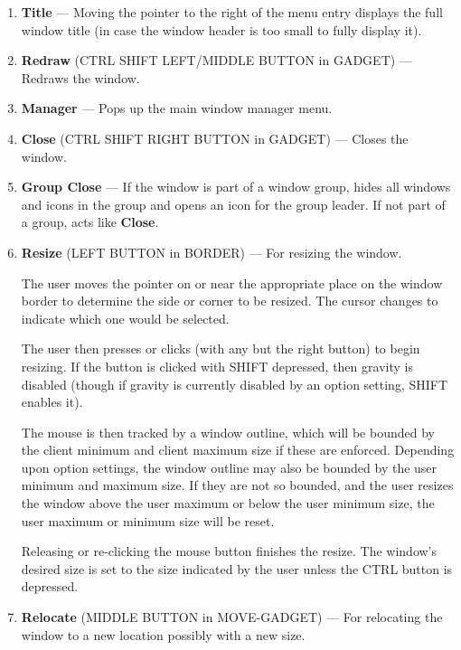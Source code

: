 \begin{enumerate}
\item {\bf Title} --- Moving the pointer to the right of the menu entry displays
the full window title (in case the window header is too small to fully
display it).

\item {\bf Redraw} ({\sc CTRL SHIFT LEFT/MIDDLE BUTTON in GADGET})  --- Redraws the
window.

\item {\bf Manager} --- Pops up the main window manager menu.

\item {\bf Close} ({\sc CTRL SHIFT RIGHT BUTTON in GADGET}) --- Closes the window.

\item {\bf Group Close} --- If the window is part of a window group, hides all
windows and icons in the group and opens an icon for the group leader.
If not part of a group, acts like {\bf Close}.

\item 
{\bf Resize} ({\sc LEFT BUTTON in BORDER}) --- For resizing the window.

The user moves the pointer on or near the appropriate place on the window
border to determine the side or corner to be resized.  The cursor changes
to indicate which one would be selected.

The user then presses or clicks (with any but the right button) to begin
resizing.  If the button is clicked with SHIFT depressed, then gravity is
disabled (though if gravity is currently disabled by an option setting,
SHIFT enables it).

The mouse is then tracked by a window outline, which will be bounded by
the client minimum and client maximum size if these are enforced.
Depending upon option settings, the window outline may also be bounded by
the user minimum and maximum size.
If they are not so bounded, and the user resizes the window above the
user maximum or below the user minimum size, the user maximum or minimum
size will be reset.

Releasing or re-clicking the mouse button finishes the resize.  The
window's desired size is set to the size indicated by the user unless the
CTRL button is depressed.


\item 
{\bf Relocate} ({\sc MIDDLE BUTTON in MOVE-GADGET}) --- For relocating the
window to a new location possibly with a new size.


\end{enumerate}
